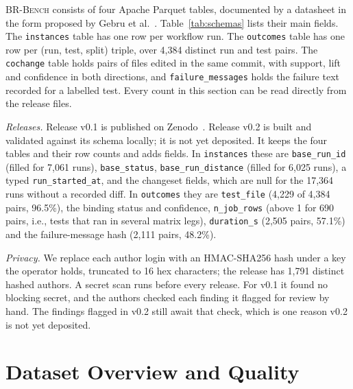 \documentclass[10pt,conference]{IEEEtran}
\begin{document}
\textsc{BR-Bench} consists of four Apache Parquet tables, documented by a datasheet in the form proposed by Gebru et al.~\cite{gebru2021datasheets}. Table~\ref{tab:schemas} lists their main fields. The \texttt{instances} table has one row per workflow run. The \texttt{outcomes} table has one row per (run, test, split) triple, over 4,384 distinct run and test pairs. The \texttt{cochange} table holds pairs of files edited in the same commit, with support, lift and confidence in both directions, and \texttt{failure\_messages} holds the failure text recorded for a labelled test. Every count in this section can be read directly from the release files.

\textit{Releases.} Release v0.1 is published on Zenodo~\cite{brbench_data}. Release v0.2 is built and validated against its schema locally; it is not yet deposited. It keeps the four tables and their row counts and adds fields. In \texttt{instances} these are \texttt{base\_run\_id} (filled for 7,061 runs), \texttt{base\_status}, \texttt{base\_run\_distance} (filled for 6,025 runs), a typed \texttt{run\_started\_at}, and the changeset fields, which are null for the 17,364 runs without a recorded diff. In \texttt{outcomes} they are \texttt{test\_file} (4,229 of 4,384 pairs, 96.5\%), the binding status and confidence, \texttt{n\_job\_rows} (above 1 for 690 pairs, i.e., tests that ran in several matrix legs), \texttt{duration\_s} (2,505 pairs, 57.1\%) and the failure-message hash (2,111 pairs, 48.2\%).

\textit{Privacy.} We replace each author login with an HMAC-SHA256 hash under a key the operator holds, truncated to 16 hex characters; the release has 1,791 distinct hashed authors. A secret scan runs before every release. For v0.1 it found no blocking secret, and the authors checked each finding it flagged for review by hand. The findings flagged in v0.2 still await that check, which is one reason v0.2 is not yet deposited.

\section{Dataset Overview and Quality}
\label{sec:overview}
\end{document}
